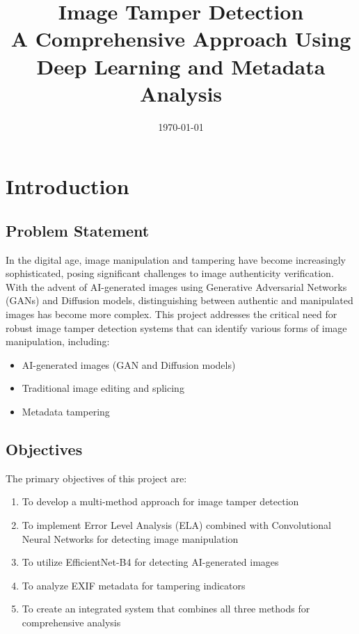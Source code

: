 \documentclass[12pt,a4paper]{article}
\title{\textbf{\Huge Image Tamper Detection}\\
\vspace{0.5cm}
\Large A Comprehensive Approach Using Deep Learning and Metadata Analysis}
\author{}
\date{\today}
\begin{document}
\maketitle
\thispagestyle{empty}
\newpage

\tableofcontents
\newpage

\section{Introduction}

\subsection{Problem Statement}
In the digital age, image manipulation and tampering have become increasingly sophisticated, posing significant challenges to image authenticity verification. With the advent of AI-generated images using Generative Adversarial Networks (GANs) and Diffusion models, distinguishing between authentic and manipulated images has become more complex. This project addresses the critical need for robust image tamper detection systems that can identify various forms of image manipulation, including:

\begin{itemize}
    \item AI-generated images (GAN and Diffusion models)
    \item Traditional image editing and splicing
    \item Metadata tampering
\end{itemize}

\subsection{Objectives}
The primary objectives of this project are:

\begin{enumerate}
    \item To develop a multi-method approach for image tamper detection
    \item To implement Error Level Analysis (ELA) combined with Convolutional Neural Networks for detecting image manipulation
    \item To utilize EfficientNet-B4 for detecting AI-generated images
    \item To analyze EXIF metadata for tampering indicators
    \item To create an integrated system that combines all three methods for comprehensive analysis
\end{enumerate}
\end{document}

